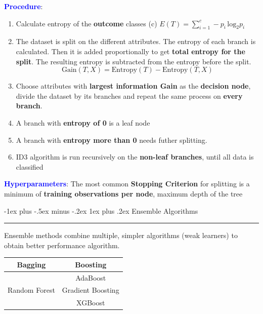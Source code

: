 \documentclass[letterpaper, 10.5pt,landscape]{article}
\makeatletter
\renewcommand{\subsubsection}{\@startsection{subsubsection}{3}{0mm}%
                                {-1ex plus -.5ex minus -.2ex}%
                                {1ex plus .2ex}%
                                {\normalfont\small\bfseries}}
\makeatother
\begin{document}
\begin{multicols*}{3}
\vspace{3pt}
\textbf{\textcolor{blue}{Procedure}}:
\vspace{-3pt}
\begin{enumerate}
    \item Calculate entropy of the \textbf{outcome} classes (c) \(\boxed{E(T) = \sum^{c}_{i=1} -p_{i} \, \text{log}_{2}p_{i}} \)
    \vspace{-2pt}
    \item The dataset is split on the different attributes. The entropy of each branch is calculated. Then it is added proportionally to get \textbf{total entropy for the split}. The resulting entropy is subtracted from the entropy before the split.
    \vspace{-3pt}
    \[\boxed{\text{Gain}(T,X) = \text{Entropy}(T) - \text{Entropy}(T, X) }\]
    \vspace{-10pt}
    \item Choose attributes with \textbf{largest information Gain} as the \textbf{decision node}, divide the dataset by its branches and repeat the same process on \textbf{every branch}.
    \vspace{-2pt}
    \item A branch with \textbf{entropy of 0} is a leaf node
    \vspace{-2pt}
    \item A branch with \textbf{entropy more than 0} needs futher splitting.
    \vspace{-2pt}
    \item ID3 algorithm is run recursively on the \textbf{non-leaf branches}, until all data is classified
    \vspace{-2pt}
\end{enumerate}


\textbf{\textcolor{blue}{Hyperparameters}}:  The most common \textbf{Stopping Criterion} for splitting is a minimum of \textbf{training observations per node},  maximum depth of the tree 



\subsubsection{Ensemble Algorithms} {\color{teal}\hrule height 0.5pt} \smallskip

Ensemble methods combine multiple, simpler algorithms (weak learners) to obtain better performance algorithm.
\vspace{-5pt}
\begin{center}
        \footnotesize
        \begin{tabular}{ c|c }
           \textbf{Bagging} & \textbf{Boosting} \\
           \hline
          & AdaBoost \\
          Random Forest & Gradient Boosting \\
          & XGBoost \\
        \end{tabular}
\end{center}
\vspace{-5pt}


\end{multicols*}
\end{document}
